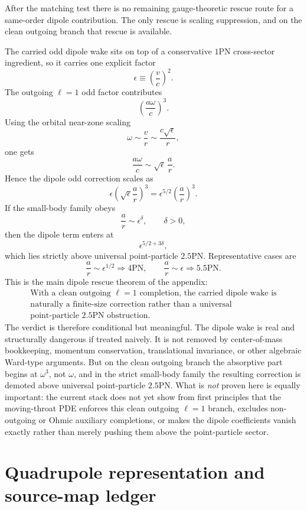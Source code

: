 \documentclass[11pt]{article}
\begin{document}
After the matching test there is no remaining gauge-theoretic rescue route for a
same-order dipole contribution.  The only rescue is scaling suppression, and on
the clean outgoing branch that rescue is available.

The carried odd dipole wake sits on top of a conservative $1$PN cross-sector
ingredient, so it carries one explicit factor
\[
\epsilon\equiv \left(\frac{v}{c}\right)^2.
\]
The outgoing $\ell=1$ odd factor contributes
\[
\left(\frac{a\omega}{c}\right)^3.
\]
Using the orbital near-zone scaling
\[
\omega\sim \frac{v}{r}\sim \frac{c\sqrt\epsilon}{r},
\]
one gets
\[
\frac{a\omega}{c}\sim \sqrt\epsilon\,\frac{a}{r}.
\]
Hence the dipole odd correction scales as
\[
\epsilon\left(\sqrt\epsilon\frac{a}{r}\right)^3
=
\epsilon^{5/2}\left(\frac{a}{r}\right)^3.
\]
If the small-body family obeys
\[
\frac{a}{r}\sim \epsilon^\delta,
\qquad
\delta>0,
\]
then the dipole term enters at
\[
\boxed{\epsilon^{5/2+3\delta},}
\]
which lies strictly above universal point-particle $2.5$PN.  Representative
cases are
\[
\frac{a}{r}\sim \epsilon^{1/2}\Rightarrow 4\mathrm{PN},
\qquad
\frac{a}{r}\sim \epsilon\Rightarrow 5.5\mathrm{PN}.
\]
This is the main dipole rescue theorem of the appendix:
\[
\boxed{\begin{gathered}
\text{With a clean outgoing }\ell=1\text{ completion, the carried dipole wake is}\\
\text{naturally a finite-size correction rather than a universal}\\
\text{point-particle }2.5\text{PN obstruction.}
\end{gathered}}
\]
The verdict is therefore conditional but meaningful.  The dipole wake is real
and structurally dangerous if treated naively.  It is not removed by
center-of-mass bookkeeping, momentum conservation, translational invariance, or
other algebraic Ward-type arguments.  But on the clean outgoing branch the
absorptive part begins at $\omega^3$, not $\omega$, and in the strict small-body
family the resulting correction is demoted above universal point-particle
$2.5$PN.  What is \emph{not} proven here is equally important: the current stack
does not yet show from first principles that the moving-throat PDE enforces this
clean outgoing $\ell=1$ branch, excludes non-outgoing or Ohmic auxiliary
completions, or makes the dipole coefficients vanish exactly rather than merely
pushing them above the point-particle sector.


\section{Quadrupole representation and source-map ledger}
\label{app:quadrupole-representation-source-map-ledger}
\end{document}
